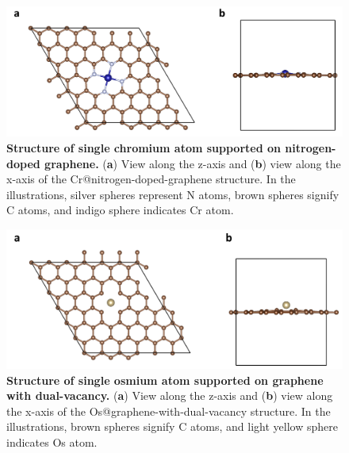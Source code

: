 \documentclass[a4paper, 12pt]{article}
\begin{document}
\begin{figure}[htbp]
  \centering
  \includegraphics[width=\textwidth]{supp_fig3_Cr-n-gra.png}
  \caption{\textbf{Structure of single chromium atom supported on nitrogen-doped graphene.}
  (\textbf{a}) View along the z-axis and (\textbf{b}) view along the x-axis
  of the Cr@nitrogen-doped-graphene structure.
  In the illustrations, silver spheres represent N atoms, brown spheres
  signify C atoms, and indigo sphere indicates Cr atom.}
  \label{supp_fig3:Cr-n-gra}
\end{figure}

\begin{figure}[htbp]
  \centering
  \includegraphics[width=\textwidth]{supp_fig4_Os-gra-vac.png}
  \caption{\textbf{Structure of single osmium atom supported on graphene with dual-vacancy.}
  (\textbf{a}) View along the z-axis and (\textbf{b}) view along the x-axis
  of the Os@graphene-with-dual-vacancy structure.
  In the illustrations, brown spheres signify C atoms, and light yellow sphere
  indicates Os atom.}
  \label{supp_fig4:Os-gra-vac}
\end{figure}
\end{document}
